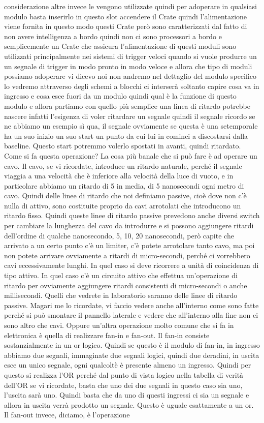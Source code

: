 considerazione altre invece le vengono utilizzate quindi per adoperare in qualsiasi modulo basta inserirlo in questo slot accendere il Crate quindi l'alimentazione viene fornita in questo modo questi Crate però sono caratterizzati dal fatto di non avere intelligenza a bordo quindi non ci sono processori a bordo e semplicemente un Crate che assicura l'alimentazione di questi moduli sono utilizzati principalmente nei sistemi di trigger veloci quando si vuole produrre un un segnale di trigger in modo pronto in modo veloce e allora che tipo di moduli possiamo adoperare vi dicevo noi non andremo nel dettaglio del modulo specifico lo vedremo attraverso degli schemi a blocchi ci interserà soltanto capire cosa va in ingresso e cosa esce fuori da un modulo quindi qual è la funzione di questo modulo e allora partiamo con quello più semplice una linea di ritardo potrebbe nascere infatti l'esigenza di voler ritardare un segnale quindi il segnale ricordo se ne abbiamo un esempio sì qua, il segnale ovviamente se questa è una setemporale ha un suo inizio un suo start un punto da cui lui in cominci a discostarsi dalla baseline. Questo start potremmo volerlo spostati in avanti, quindi ritardato. Come si fa questa operazione? La cosa più banale che si può fare è ad operare un cavo. Il cavo, se vi ricordate, introduce un ritardo naturale, perché il segnale viaggia a una velocità che è inferiore alla velocità della luce di vuoto, e in particolare abbiamo un ritardo di 5 in media, di 5 nanosecondi ogni metro di cavo. Quindi delle linee di ritardo che noi definiamo passive, cioè dove non c'è nulla di attivo, sono costituite proprio da cavi arrotolati che introducono un ritardo fisso. Quindi queste linee di ritardo passive prevedono anche diversi switch per cambiare la lunghezza del cavo da introdurre e si possono aggiungere ritardi dell'ordine di qualche nanosecondo, 5, 10, 20 nanosecondi, però capite che arrivato a un certo punto c'è un limiter, c'è potete arrotolare tanto cavo, ma poi non potete arrivare ovviamente a ritardi di micro-secondi, perché ci vorrebbero cavi eccessivamente lunghi. In quel caso si deve ricorrere a unità di coincidenza di tipo attivo. In quel caso c'è un circuito attivo che effettua un'operazione di ritardo per ovviamente aggiungere ritardi consistenti di micro-secondi o anche millisecondi. Quelli che vedrete in laboratorio saranno delle linee di ritardo passive. Magari me lo ricordate, vi faccio vedere anche all'interno come sono fatte perché si può smontare il pannello laterale e vedere che all'interno alla fine non ci sono altro che cavi. Oppure un'altra operazione molto comune che si fa in elettronica è quella di realizzare fan-in e fan-out. Il fan-in consiste sostanzialmente in un or logico. Quindi se questo è il modulo di fan-in, in ingresso abbiamo due segnali, immaginate due segnali logici, quindi due deradini, in uscita esce un unico segnale, ogni qualcoltè è presente almeno un ingresso. Quindi per questo si realizza l'OR perché dal punto di vista logico nella tabella di verità dell'OR se vi ricordate, basta che uno dei due segnali in questo caso sia uno, l'uscita sarà uno. Quindi basta che da uno di questi ingressi ci sia un segnale e allora in uscita verrà prodotto un segnale. Questo è uguale esattamente a un or. Il fan-out invece, diciamo, è l'operazione 